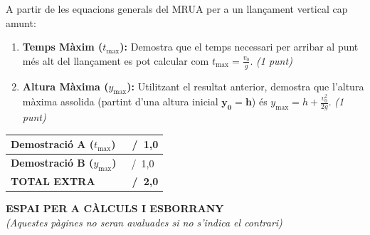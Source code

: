 \documentclass[12pt,a4paper,twoside]{article}
\begin{document}
A partir de les equacions generals del MRUA per a un llançament vertical cap amunt:

\begin{enumerate}[label=\textbf{\alph*)}, itemsep=15pt]
  \item \textbf{Temps Màxim ($t_{\max}$):} Demostra que el temps necessari per arribar al punt més alt del llançament es pot calcular com $t_{\max} = \frac{v_0}{g}$. \textit{(1 punt)}
  \item \textbf{Altura Màxima ($y_{\max}$):} Utilitzant el resultat anterior, demostra que l'altura màxima assolida (partint d'una altura inicial $\mathbf{y_0 = h}$) és $y_{\max} = h + \frac{v_0^2}{2g}$. \textit{(1 punt)}
\end{enumerate}

\vfill

\noindent
\begin{tabularx}{\textwidth}{|>{\raggedright\arraybackslash}X|>{\centering\arraybackslash}p{5cm}|}
  \hline
  \rule{0pt}{22pt}\textbf{Demostració A ($t_{\max}$)} & \Large\hspace{2.5cm}~/~1,0 \\[8pt]
  \hline
  \rule{0pt}{22pt}\textbf{Demostració B ($y_{\max}$)} & \Large\hspace{2.5cm}~/~1,0 \\[8pt]
  \hline
  \rule{0pt}{22pt}\textbf{\Large TOTAL EXTRA} & \Large\textbf{\hspace{2.5cm}~/~2,0} \\[8pt]
  \hline
\end{tabularx}

\cleardoublepage

\pagestyle{empty}
\begin{center}
  \vspace*{2cm}
  {\Large\bfseries ESPAI PER A CÀLCULS I ESBORRANY}\\[1cm]
  \textit{(Aquestes pàgines no seran avaluades si no s'indica el contrari)}
\end{center}

\newpage
\mbox{}
\end{document}
